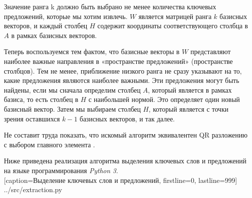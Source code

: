 Значение ранга k должно быть выбрано не менее количества ключевых предложений, которые мы хотим извлечь.
$W$ является матрицей ранга $k$ базисных векторов,
и каждый столбец $H$ содержит координаты соответствующего столбца в $A$ в рамках базисных векторов.

Теперь воспользуемся тем фактом, что базисные векторы в $W$ представляют наиболее важные направления в «пространстве предложений» (пространстве столбцов).
Тем не менее, приближение низкого ранга не сразу указывают на то, какие предложения являются наиболее важными.
Эти предложения могут быть найдены, если мы сначала определим столбец $A$, который является  в рамках базиса,
то есть столбец в $H$ с наибольшей нормой. Это определяет один новый базисный вектор.
Затем мы выбираем столбец $H$, который является  с точки зрения оставшихся $k-1$ базисных векторов, и так далее.

Не составит труда показать, что искомый алгоритм эквивалентен QR разложению с выбором главного элемента \cite{blas}.

\newpage

Ниже приведена реализация алгоритма выделения ключевых слов и предложений на языке программирования \textit{Python 3}.
\\


  [caption=Выделение ключевых слов и предложений, firstline=0, lastline=999]
  {../src/extraction.py}
